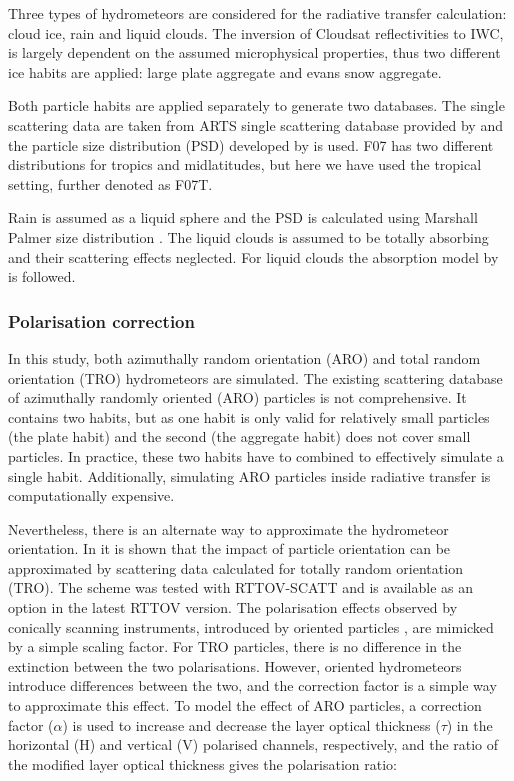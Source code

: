 \documentclass[amt, manuscript]{copernicus}
\begin{document}
Three types of hydrometeors are considered for the radiative transfer calculation: cloud ice, rain and liquid clouds. The inversion of Cloudsat reflectivities to IWC, is largely dependent on the assumed microphysical properties, thus two different ice habits are applied: large plate aggregate and evans snow aggregate. 

Both particle habits are applied separately to generate two databases.
The single scattering data are taken from ARTS single scattering database provided by \citet{eriksson:agene:18} and the particle size distribution (PSD) developed by \citet{field:snows:07} is used. F07 has two different distributions for tropics and midlatitudes, but here we have used the tropical setting, further denoted as F07T. 

Rain is assumed as a liquid sphere and the PSD is calculated using Marshall Palmer size distribution \citep{marshall:thedi:48}. The liquid clouds is assumed to be totally absorbing and their scattering effects neglected. For liquid clouds the absorption model by \citet{ellison2007permittivity} is followed.  


\subsubsection{Polarisation correction}
\label{sec:scaling_factor}

In this study, both azimuthally random orientation (ARO)  and total random orientation (TRO) hydrometeors are simulated. The existing scattering database of azimuthally randomly oriented (ARO) particles \citep{brath:micro:20} is not comprehensive. It contains two habits, but as one habit is only valid for relatively small particles (the plate habit) and the second (the aggregate habit) does not cover small particles. In practice, these two habits have to combined to effectively simulate a single habit. Additionally, simulating ARO particles inside radiative transfer is computationally expensive.

Nevertheless, there is an alternate way to approximate the hydrometeor orientation. In \citet{barlakas:intro:21} it is shown that the impact of particle orientation can be approximated by scattering data calculated for totally random orientation (TRO). The scheme was tested with RTTOV-SCATT and is available as an option in the latest RTTOV version. The polarisation effects observed by conically scanning instruments, introduced by oriented particles \citep{gong:micro:17} \citep{prigent} , are mimicked by a simple scaling factor. For TRO particles, there is no difference in the extinction between the two polarisations. However, oriented hydrometeors introduce differences between the two, and the correction factor is a simple way to approximate this effect. To model the effect of ARO particles, a correction factor ($\alpha$) is used to increase and decrease the layer optical thickness ($\tau$) in the horizontal (H) and vertical (V) 
polarised channels, respectively, and the ratio of the modified layer optical thickness gives the polarisation ratio:
\end{document}
